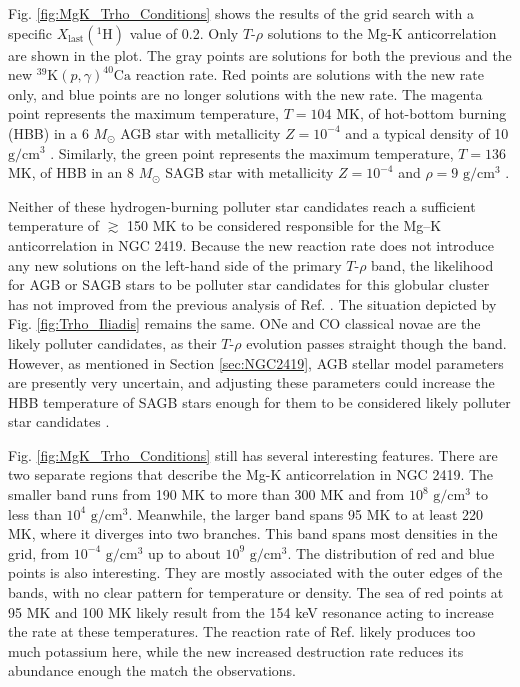 Fig. \ref{fig:MgK_Trho_Conditions} shows the results of the grid search with a specific $X_{\mathrm{last}}(^{1}\mathrm{H})$ value of 0.2. Only $T$-$\rho$ solutions to the Mg-K anticorrelation are shown in the plot. The gray points are solutions for both the previous \cite{Longland2018} and the new $^{39}\mathrm{K}(p,\gamma)^{40}\mathrm{Ca}$ reaction rate. Red points are solutions with the new rate only, and blue points are no longer solutions with the new rate. The magenta point represents the maximum temperature, $T=104$ MK, of hot-bottom burning (HBB) in a 6 $M_{\odot}$ AGB star with metallicity $Z = 10^{-4}$ and a typical density of 10 $\mathrm{g}/\mathrm{cm}^{3}$ \cite{Karakas2010}. Similarly, the green point represents the maximum temperature, $T=136$ MK, of HBB in an 8 $M_{\odot}$ SAGB star with metallicity $Z = 10^{-4}$ and $\rho=9$ $\mathrm{g}/\mathrm{cm}^{3}$ \cite{Doherty2015}. 

Neither of these hydrogen-burning polluter star candidates reach a sufficient temperature of $\gtrsim$ 150 MK to be considered responsible for the Mg--K anticorrelation in NGC 2419. Because the new reaction rate does not introduce any new solutions on the left-hand side of the primary $T$-$\rho$ band, the likelihood for AGB or SAGB stars to be polluter star candidates for this globular cluster has not improved from the previous analysis of Ref. \cite{Iliadis2016}. The situation depicted by Fig. \ref{fig:Trho_Iliadis} remains the same. ONe and CO classical novae are the likely polluter candidates, as their $T$-$\rho$ evolution passes straight though the band. However, as mentioned in Section \ref{sec:NGC2419}, AGB stellar model parameters are presently very uncertain, and adjusting these parameters could increase the HBB temperature of SAGB stars enough for them to be considered likely polluter star candidates \cite{Iliadis2016}.

Fig. \ref{fig:MgK_Trho_Conditions} still has several interesting features. There are two separate regions that describe the Mg-K anticorrelation in NGC 2419. The smaller band runs from 190 MK to more than 300 MK and from $10^{8}$ $\mathrm{g}/\mathrm{cm}^{3}$ to less than $10^{4}$ $\mathrm{g}/\mathrm{cm}^{3}$. Meanwhile, the larger band spans 95 MK to at least 220 MK, where it diverges into two branches. This band spans most densities in the grid, from $10^{-4}$ $\mathrm{g}/\mathrm{cm}^{3}$ up to about $10^{9}$ $\mathrm{g}/\mathrm{cm}^{3}$. The distribution of red and blue points is also interesting. They are mostly associated with the outer edges of the bands, with no clear pattern for temperature or density. The sea of red points at 95 MK and 100 MK likely result from the 154 keV resonance acting to increase the rate at these temperatures. The reaction rate of Ref. \cite{Longland2018} likely produces too much potassium here, while the new increased destruction rate reduces its abundance enough the match the observations.

